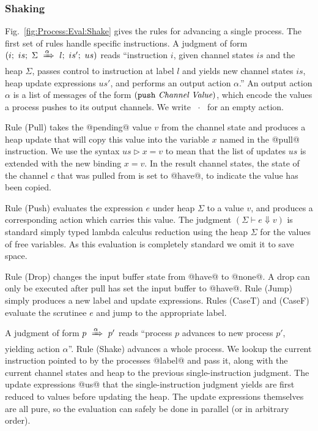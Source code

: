 



\subsubsection{Shaking}
Fig.~\ref{fig:Process:Eval:Shake} gives the rules for advancing a single process. The first set of rules handle specific instructions. A judgment of form $(i;~is;~\Sigma~\xRightarrow{\alpha}~l;~is';~us)$ reads ``instruction $i$, given channel states $is$ and the heap $\Sigma$, passes control to instruction at label $l$ and yields new channel states $is$, heap update expressions $us'$, and performs an output action $\alpha$.'' An output action $\alpha$ is a list of messages of the form $(\texttt{push}~\textit{Channel}~\textit{Value})$, which encode the values a process pushes to its output channels. We write ~$\cdot$~ for an empty action. 

\eject{}
Rule (Pull) takes the @pending@ value $v$ from the channel state and produces a heap update that will copy this value into the variable $x$ named in the @pull@ instruction. We use the syntax $us \rhd x=v$ to mean that the list of updates $us$ is extended with the new binding $x=v$. In the result channel states, the state of the channel $c$ that was pulled from is set to @have@, to indicate the value has been copied.

Rule (Push) evaluates the expression $e$ under heap $\Sigma$ to a value $v$, and produces a corresponding action which carries this value. The judgment $(\Sigma \vdash e \Downarrow v)$ is standard simply typed lambda calculus reduction using the heap $\Sigma$ for the values of free variables. As this evaluation is completely standard we omit it to save space.


Rule (Drop) changes the input buffer state from @have@ to @none@. A drop can only be executed after pull has set the input buffer to @have@. Rule (Jump) simply produces a new label and update expressions. Rules (CaseT) and (CaseF) evaluate the scrutinee $e$ and jump to the appropriate label.

A judgment of form $p~\xRightarrow{\alpha}~p'$ reads ``process $p$ advances to new process $p'$, yielding action $\alpha$''. Rule (Shake) advances a whole process. We lookup the current instruction pointed to by the processes @label@ and pass it, along with the current channel states and heap to the previous single-instruction judgment. The update expressions @us@ that the single-instruction judgment yields are first reduced to values before updating the heap. The update expressions themselves are all pure, so the evaluation can safely be done in parallel (or in arbitrary order).


